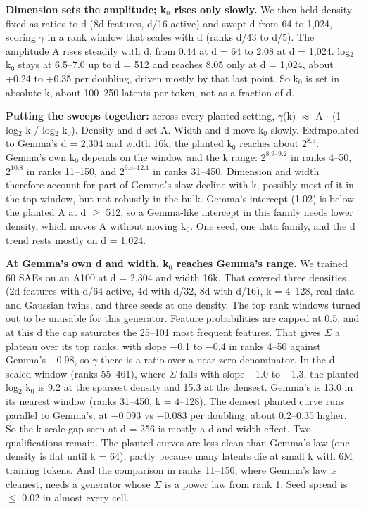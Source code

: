 \documentclass[11pt]{article}
\begin{document}
\textbf{Dimension sets the amplitude; k$_0$ rises only slowly.} We then held density fixed as ratios to d (8d features, d/16 active) and swept d from 64 to 1,024, scoring $\gamma$ in a rank window that scales with d (ranks d/43 to d/5). The amplitude A rises steadily with d, from 0.44 at d = 64 to 2.08 at d = 1,024. log$_2$ k$_0$ stays at 6.5--7.0 up to d = 512 and reaches 8.05 only at d = 1,024, about +0.24 to +0.35 per doubling, driven mostly by that last point. So k$_0$ is set in absolute k, about 100--250 latents per token, not as a fraction of d.

\textbf{Putting the sweeps together:} across every planted setting, $\gamma$(k) $\approx$ A $\cdot$ (1 $-$ log$_2$ k / log$_2$ k$_0$). Density and d set A. Width and d move k$_0$ slowly. Extrapolated to Gemma's d = 2,304 and width 16k, the planted k$_0$ reaches about $2^{8.5}$. Gemma's own k$_0$ depends on the window and the k range: $2^{8.9\textrm{--}9.2}$ in ranks 4--50, $2^{10.8}$ in ranks 11--150, and $2^{9.4\textrm{--}12.1}$ in ranks 31--450. Dimension and width therefore account for part of Gemma's slow decline with k, possibly most of it in the top window, but not robustly in the bulk. Gemma's intercept (1.02) is below the planted A at d $\ge$ 512, so a Gemma-like intercept in this family needs lower density, which moves A without moving k$_0$. One seed, one data family, and the d trend rests mostly on d = 1,024.

\textbf{At Gemma's own d and width, k$_0$ reaches Gemma's range.} We trained 60 SAEs on an A100 at d = 2,304 and width 16k. That covered three densities (2d features with d/64 active, 4d with d/32, 8d with d/16), k = 4--128, real data and Gaussian twins, and three seeds at one density. The top rank windows turned out to be unusable for this generator. Feature probabilities are capped at 0.5, and at this d the cap saturates the 25--101 most frequent features. That gives $\Sigma$ a plateau over its top ranks, with slope $-$0.1 to $-$0.4 in ranks 4--50 against Gemma's $-$0.98, so $\gamma$ there is a ratio over a near-zero denominator. In the d-scaled window (ranks 55--461), where $\Sigma$ falls with slope $-$1.0 to $-$1.3, the planted log$_2$ k$_0$ is 9.2 at the sparsest density and 15.3 at the densest. Gemma's is 13.0 in its nearest window (ranks 31--450, k = 4--128). The densest planted curve runs parallel to Gemma's, at $-$0.093 vs $-$0.083 per doubling, about 0.2--0.35 higher. So the k-scale gap seen at d = 256 is mostly a d-and-width effect. Two qualifications remain. The planted curves are less clean than Gemma's law (one density is flat until k = 64), partly because many latents die at small k with 6M training tokens. And the comparison in ranks 11--150, where Gemma's law is cleanest, needs a generator whose $\Sigma$ is a power law from rank 1. Seed spread is $\le$ 0.02 in almost every cell.
\end{document}
